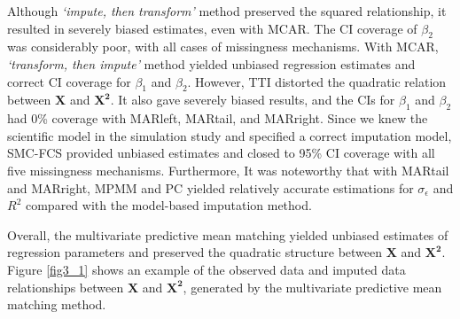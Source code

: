 	Although \emph{`impute, then transform'} method preserved the squared relationship, it resulted in severely biased estimates, even with MCAR. The CI coverage of $\beta_2$ was considerably poor, with all cases of missingness mechanisms. With MCAR, \emph{`transform, then impute'} method yielded unbiased regression estimates and correct CI coverage for $\beta_1$ and $\beta_2$. However, TTI distorted the quadratic relation between $\boldsymbol{X}$ and $\boldsymbol{X^2}$. It also gave severely biased results, and the CIs for $\beta_1$ and $\beta_2$ had 0\% coverage with MARleft, MARtail, and MARright. Since we knew the scientific model in the simulation study and specified a correct imputation model, SMC-FCS provided unbiased estimates and closed to 95\% CI coverage with all five missingness mechanisms. Furthermore, It was noteworthy that with MARtail and MARright, MPMM and PC yielded relatively accurate estimations for $\sigma_\epsilon$ and $R^2$ compared with the model-based imputation method.    
	
	
	Overall, the multivariate predictive mean matching yielded unbiased estimates of regression parameters and preserved the quadratic structure between $\boldsymbol{X}$ and $\boldsymbol{X^2}$. Figure \ref{fig3_1} shows an example of the observed data and imputed data relationships between $\boldsymbol{X}$ and $\boldsymbol{X^2}$, generated by the multivariate predictive mean matching method.
	
